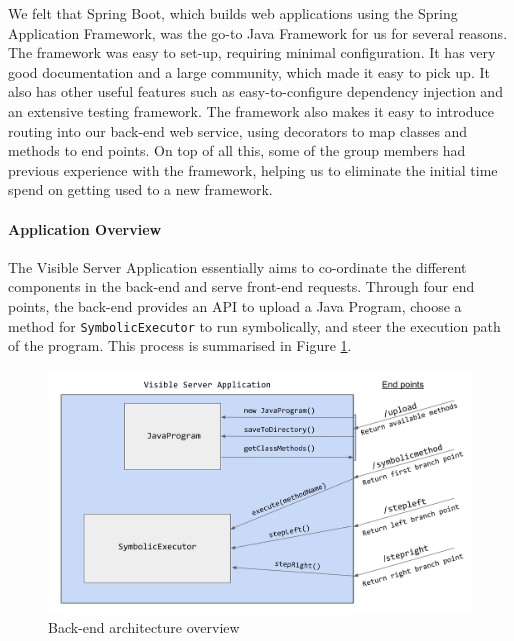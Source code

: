 \documentclass[titlepage,11pt]{article}
\begin{document}
We felt that Spring Boot, which builds web applications using the Spring Application Framework, was the go-to Java Framework for us for several reasons. The framework was easy to set-up, requiring minimal configuration. It has very good documentation and a large community, which made it easy to pick up. It also has other useful features such as easy-to-configure dependency injection and an extensive testing framework. The framework also makes it easy to introduce routing into our back-end web service, using decorators to map classes and methods to end points. On top of all this, some of the group members had previous experience with the framework, helping us to eliminate the initial time spend on getting used to a new framework.

\paragraph{Application Overview}

The Visible Server Application essentially aims to co-ordinate the different components in the back-end and serve front-end requests. Through four end points, the back-end provides an API to upload a Java Program, choose a method for \texttt{SymbolicExecutor} to run symbolically, and steer the execution path of the program. This process is summarised in Figure \ref{fig:visibleserver}. \\

\begin{figure}
\centering
\includegraphics[scale=0.45]{visibleserver.png}
\caption{Back-end architecture overview}
\label{fig:visibleserver}
\end{figure}
\end{document}
